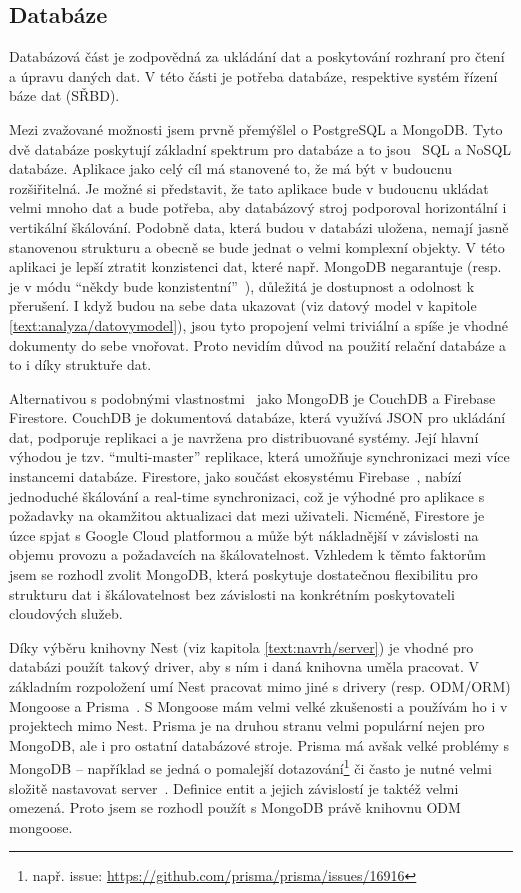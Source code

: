 \subsection{Databáze}\label{text:navrh/databaze}

Databázová část je zodpovědná za ukládání dat a poskytování rozhraní pro čtení a úpravu daných dat. 
V této části je potřeba databáze, respektive systém řízení báze dat (SŘBD).

Mezi zvažované možnosti jsem prvně přemýšlel o PostgreSQL a MongoDB.
Tyto dvě databáze poskytují základní spektrum pro databáze a to jsou~\cite{irena2015big, marek2018sql} SQL a NoSQL databáze. 
Aplikace jako celý cíl má stanovené to, že má být v budoucnu rozšiřitelná.
Je možné si představit, že tato aplikace bude v budoucnu ukládat velmi mnoho dat a bude potřeba, aby databázový stroj podporoval horizontální i vertikální škálování.
Podobně data, která budou v databázi uložena, nemají jasně stanovenou strukturu a obecně se bude jednat o velmi komplexní objekty.
V této aplikaci je lepší ztratit konzistenci dat, které např. MongoDB negarantuje (resp. je v módu \enquote{někdy bude konzistentní}~\cite{irena2015big}), důležitá je dostupnost a odolnost k přerušení.
I když budou na sebe data ukazovat (viz datový model v kapitole \ref{text:analyza/datovymodel}), jsou tyto propojení velmi triviální a spíše je vhodné dokumenty do sebe vnořovat.
Proto nevidím důvod na použití relační databáze a to i díky struktuře dat.

Alternativou s podobnými vlastnostmi~\cite{irena2015big} jako MongoDB je CouchDB a Firebase Firestore. 
CouchDB je dokumentová databáze, která využívá JSON pro ukládání dat, podporuje replikaci a je navržena pro distribuované systémy. 
Její hlavní výhodou je tzv. \enquote{multi-master} replikace, která umožňuje synchronizaci mezi více instancemi databáze. 
Firestore, jako součást ekosystému Firebase~\cite{firebase}, nabízí jednoduché škálování a real-time synchronizaci, což je výhodné pro aplikace s požadavky na okamžitou aktualizaci dat mezi uživateli. 
Nicméně, Firestore je úzce spjat s Google Cloud platformou a může být nákladnější v závislosti na objemu provozu a požadavcích na škálovatelnost. 
Vzhledem k těmto faktorům jsem se rozhodl zvolit MongoDB, která poskytuje dostatečnou flexibilitu pro strukturu dat i škálovatelnost bez závislosti na konkrétním poskytovateli cloudových služeb.

Díky výběru knihovny Nest (viz kapitola \ref{text:navrh/server}) je vhodné pro databázi použít takový driver, aby s ním i daná knihovna uměla pracovat.
V základním rozpoložení umí Nest pracovat mimo jiné s drivery (resp. ODM/ORM) Mongoose a Prisma~\cite{nest_database}.
S Mongoose mám velmi velké zkušenosti a používám ho i v projektech mimo Nest.
Prisma je na druhou stranu velmi populární nejen pro MongoDB, ale i pro ostatní databázové stroje.
Prisma má avšak velké problémy s MongoDB -- například se jedná o pomalejší dotazování\footnote{např. issue: \url{https://github.com/prisma/prisma/issues/16916}} či často je nutné velmi složitě nastavovat server~\cite{prisma_2025}.
Definice entit a jejich závislostí je taktéž velmi omezená.
Proto jsem se rozhodl použít s MongoDB právě knihovnu ODM mongoose.

